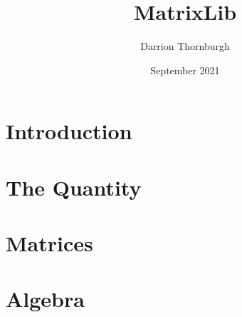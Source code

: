 \documentclass[12pt,letterpaper]{article}
\title{MatrixLib
    }
\author{Darrion Thornburgh}
\date{September 2021}
\newcommand{\Hquad}{\hspace{0.5em}}
\begin{document}
\Hquad %
\section{Introduction}


\section{The Quantity}


\section{Matrices}


\section{Algebra}

\end{document}
